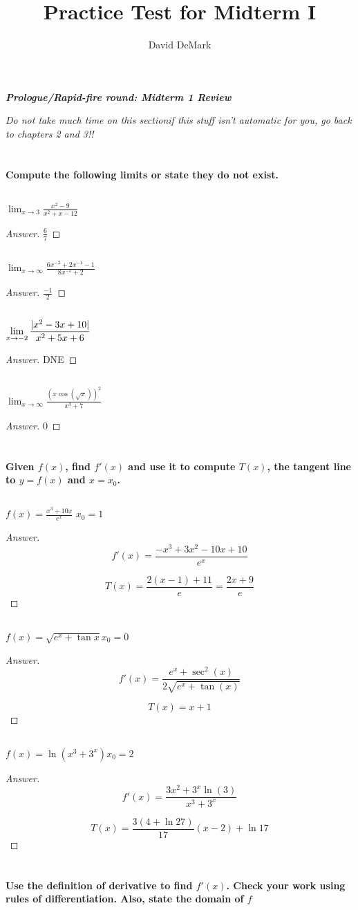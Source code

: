 \documentclass[english]{article}
\title{Practice Test for Midterm I}
\author{David DeMark}
\date{\due}
\DeclarePairedDelimiter\abs{\lvert}{\rvert}%
\newcommand{\prob}[1]{\setcounter{section}{#1-1}\section{}}
\newcommand{\prt}[1]{\setcounter{subsection}{#1-1}\subsection{}}
\theoremstyle{remark}
\theoremstyle{definition}
\newcommand{\ild}[1]{\displaystyle{#1}}
\begin{document}
	\begin{center}{\Large\textbf{\emph{Prologue/Rapid-fire round: Midterm 1 Review}}}\end{center}
	\emph{Do not take much time on this section\textemdash if this stuff isn't automatic for you, go back to chapters 2 and 3!!}

	\prob{-2} \textbf{Compute the following limits or state they do not exist.}
	\prt{1}$\ild{\lim_{x\to 3}\frac{x^2-9}{x^2+x-12}}$
	\begin{proof}[Answer]
		$\frac{6}{7}$
	\end{proof}
	\vspace{1cm}
	\prt{2}$\ild{\lim_{x\to\infty}\frac{6x^{-2}+2x^{-1}-1}{8x^{-5}+2}}$
		\begin{proof}[Answer]
		$\frac{-1}{2}$
	\end{proof}
	\vspace{1cm}
	\prt{3} $\ild{\lim_{x\to -2}\frac{\abs{x^2-3x+10}}{x^2+5x+6}}$
		\begin{proof}[Answer]
	DNE
	\end{proof}
\vspace{3cm}
\prt{4} $\ild{\lim_{x\to \infty} \frac{(x\cos(\sqrt{x}))^2}{x^3+7}}$
	\begin{proof}[Answer]
	$0$
\end{proof}
\vspace{1cm}
\prob{-1} \textbf{Given $f(x)$, find $f'(x)$ and use it to compute $T(x)$, the tangent line to $y=f(x)$ and $x=x_0$.}
\prt{1} $\ild{f(x)= \frac{x^3+10x}{e^x}}$
\newline$x_0=1$
	\begin{proof}[Answer]
	$$f'(x)=\frac{-x^3+3x^2-10x+10}{e^x}$$
	
	$$T(x)=\frac{2(x-1)+11}{e}=\frac{2x+9}{e}$$
\end{proof}


\prt{2} $\ild{f(x)=\sqrt{e^x+\tan{x}}}$\newline$x_0=0$
	\begin{proof}[Answer]
	$$f'(x)=\frac{e^x+\sec ^2(x)}{2 \sqrt{e^x+\tan (x)}}$$
	
	$$T(x)=x+1$$
\end{proof}
\prt{3} $\ild{f(x)=\ln(x^3+3^x)}$\newline$x_0=2$
	\begin{proof}[Answer]
	$$f'(x)=\frac{3 x^2+3^x \ln (3)}{x^3+3^x}$$
	
	$$T(x)=\frac{3(4+\ln27)}{17}(x-2)+\ln 17$$
\end{proof}

\prob{0}\textbf{Use the definition of derivative to find $f'(x)$. Check your work using rules of differentiation. Also, state the domain of $f$}
\end{document}
